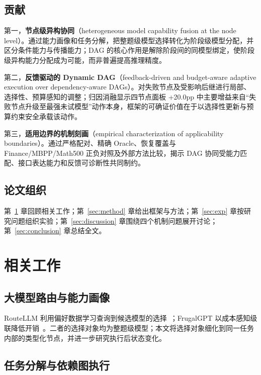 \documentclass[review,12pt]{elsarticle}
\begin{document}
\subsection{贡献}

第一，\textbf{节点级异构协同}（heterogeneous model capability fusion at the node level）。通过能力画像和任务分解，把整题级模型选择转化为阶段级模型分配，并区分条件能力与传播能力；DAG 的核心作用是解除阶段间的同模型绑定，使阶段级异构能力分配成为可能，而非普遍提高推理精度。

第二，\textbf{反馈驱动的 Dynamic DAG}（feedback-driven and budget-aware adaptive execution over dependency-aware DAGs）。对失败节点及受影响后继进行局部、选择性、预算感知的调整；归因消融显示四节点面板 +20.0pp 中主要增益来自``失败节点升级至最强未试模型''动作本身，框架的可确证价值在于以选择性更新与预算约束安全承载该动作。

第三，\textbf{适用边界的机制刻画}（empirical characterization of applicability boundaries）。通过严格配对、精确 Oracle、恢复覆盖与 Finance/MBPP/Math500 正负对照及外部方法比较，揭示 DAG 协同受能力匹配、接口表达能力和反馈可诊断性共同制约。

\subsection{论文组织}

第~\ref{sec:related} 章回顾相关工作；第~\ref{sec:method} 章给出框架与方法；第~\ref{sec:exp} 章按研究问题组织实验；第~\ref{sec:discussion} 章围绕四个机制问题展开讨论；第~\ref{sec:conclusion} 章总结全文。

\section{相关工作}\label{sec:related}

\subsection{大模型路由与能力画像}

RouteLLM 利用偏好数据学习查询到候选模型的选择~\cite{ong2024routellm}；FrugalGPT 以成本感知级联降低开销~\cite{chen2023frugalgpt}。二者的选择对象均为整题级模型；本文将选择对象细化到同一任务内部的类型化节点，并进一步研究执行后状态变化。

\subsection{任务分解与依赖图执行}
\end{document}

